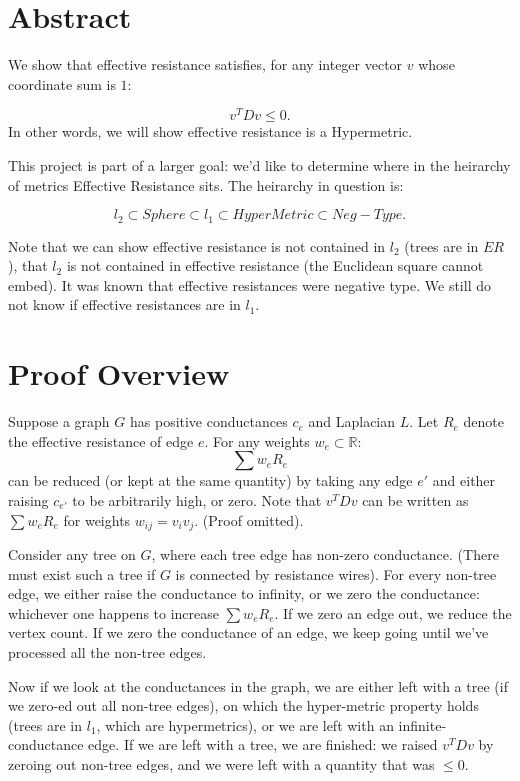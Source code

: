 

\section{Abstract}
We show that effective resistance satisfies, for any integer vector $v$
whose coordinate sum is $1$:

\[
  v^T D v \leq 0.
  \]
In other words, we will show effective resistance is a Hypermetric.

This project is part of a larger goal: we'd like to determine where in the heirarchy of
metrics Effective Resistance sits. The heirarchy in question is:

\[ l_2 \subset Sphere \subset l_1 \subset HyperMetric \subset Neg-Type. \]

Note that we can show effective resistance is not contained in $l_2$
(trees are in $ER$), that $l_2$ is not contained in effective resistance
(the Euclidean square cannot embed). It was known that effective
resistances were negative type. We still do not know if effective
resistances are in $l_1$.
\section{Proof Overview}
Suppose a graph $G$ has positive conductances $c_e$ and Laplacian $L$. Let $R_e$
denote the effective resistance of edge $e$. For any
weights $w_e \subset \mathbb{R}$:
\[ \sum w_e R_e \]
can be reduced (or kept at the same quantity) by taking any edge $e'$
and either raising $c_{e'}$ to be arbitrarily high, or zero. Note that
$v^T D v$ can be written as $\sum w_e R_e$ for weights $w_{ij} =
v_{i}v_{j}$. (Proof omitted).

Consider any tree on $G$, where each tree edge has non-zero
conductance. (There must exist such a tree if $G$ is connected by
    resistance wires). For every non-tree edge, we either raise the
conductance to infinity, or we zero the conductance: whichever one happens to
increase $\sum w_e R_e$. If we zero an edge out, we reduce the vertex
count. If we zero the conductance of an edge, we keep going until
we've processed all the non-tree edges.

Now if we look at the conductances in the graph, we are either left with
a tree (if we zero-ed out all non-tree edges),
     on which the hyper-metric property
holds (trees are in $l_1$, which are hypermetrics), or we are left with
an infinite-conductance edge. If we are left with a tree, we are finished:
we raised $v^T D v$ by zeroing out non-tree edges, and we were left with
a quantity that was $\leq 0$. 


